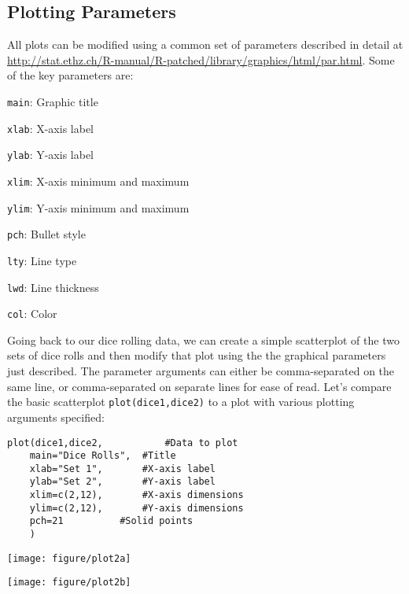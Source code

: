 \documentclass[12pt]{article}\usepackage[]{graphicx}\usepackage[]{color}
\makeatletter
\def\maxwidth{ %
  \ifdim\Gin@nat@width>\linewidth
    \linewidth
  \else
    \Gin@nat@width
  \fi
}
\newenvironment{knitrout}{}{} %
\makeatother
\begin{document}
\subsection{Plotting Parameters}
All plots can be modified using a common set of parameters described in detail at \url{http://stat.ethz.ch/R-manual/R-patched/library/graphics/html/par.html}. Some of the key parameters are:
\begin{itemize*}
\item \verb|main|: Graphic title
\item \verb|xlab|: X-axis label
\item \verb|ylab|: Y-axis label
\item \verb|xlim|: X-axis minimum and maximum
\item \verb|ylim|: Y-axis minimum and maximum
\item \verb|pch|: Bullet style
\item \verb|lty|: Line type
\item \verb|lwd|: Line thickness
\item \verb|col|: Color
\end{itemize*}

Going back to our dice rolling data, we can create a simple scatterplot of the two sets of dice rolls and then modify that plot using the the graphical parameters just described. The parameter arguments can either be comma-separated on the same line, or comma-separated on separate lines for ease of read. Let's compare the basic scatterplot \verb|plot(dice1,dice2)| to a plot with various plotting arguments specified:
\begin{verbatim}
plot(dice1,dice2,			#Data to plot
	main="Dice Rolls",	#Title
	xlab="Set 1",		#X-axis label
	ylab="Set 2",		#Y-axis label
	xlim=c(2,12),		#X-axis dimensions
	ylim=c(2,12),		#Y-axis dimensions
	pch=21			#Solid points
	)
\end{verbatim}

\begin{minipage}[b]{0.5\linewidth}
\begin{knitrout}
\color{fgcolor}
\texttt{[image: figure/plot2a]} 

\end{knitrout}

\end{minipage}
\begin{minipage}[b]{0.5\linewidth}
\begin{knitrout}
\color{fgcolor}
\texttt{[image: figure/plot2b]} 

\end{knitrout}

\end{minipage}
\end{document}
